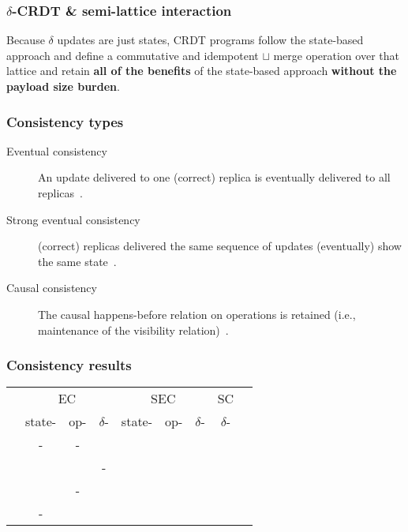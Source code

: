 \documentclass[aspectratio=169,compress]{beamer}
\newcommand{\cmark}{\ding{51}}
\begin{document}
  \begin{frame}
    \frametitle{$\delta$-CRDT \& semi-lattice interaction}

    Because $\delta$ updates are just states, CRDT programs follow the
    state-based approach and define a commutative and idempotent $\sqcup$ merge
    operation over that lattice and retain \textbf{all of the benefits} of
    the state-based approach \textbf{without the payload size burden}.
  \end{frame}

  \begin{frame}
    \frametitle{Consistency types}

    \begin{description}
      \item[Eventual consistency] An update delivered to one (correct) replica
        is eventually delivered to all replicas~\citep{shapiro11}.
      \item[Strong eventual consistency] (correct) replicas delivered the same
        sequence of updates (eventually) show the same state~\citep{shapiro11}.
      \item[Causal consistency] The causal happens-before relation on operations
        is retained (i.e., maintenance of the visibility
        relation)~\citep{almeida16}.
    \end{description}
  \end{frame}

  \begin{frame}
    \frametitle{Consistency results}

    \begin{table}
      \begin{tabular}{rcccccccc}
        & \multicolumn{3}{c}{EC}
        & \multicolumn{3}{c}{SEC}
        & \multicolumn{1}{c}{SC} \\
        \cmidrule(lr){2-4} \cmidrule(lr){5-7} \cmidrule(lr){8-8}
          & state- & op- & $\delta$-
          & state- & op- & $\delta$-
          & $\delta$- \\
        \midrule
          \cite{shapiro11} & - & - & & \cmark & \cmark & & \\
          \cite{almeida16} & & & - & & & \cmark & \cmark   \\
          \cite{gomes17} & & - & & & \cmark\footnotemark[1] & & \\
          \cite{zeller14} & - & & & \cmark\footnotemark[2] & & & \\
      \end{tabular}
    \end{table}
  \end{frame}
\end{document}
